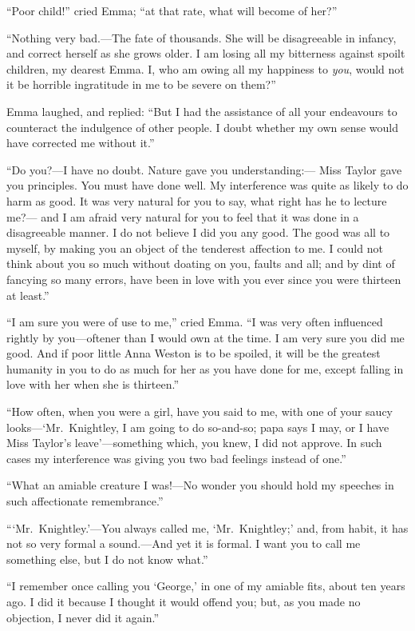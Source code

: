 ``Poor child!'' cried Emma; ``at that rate, what will become of her?''

``Nothing very bad.---The fate of thousands.  She will be disagreeable
in infancy, and correct herself as she grows older.  I am losing
all my bitterness against spoilt children, my dearest Emma.
I, who am owing all my happiness to \emph{you}, would not it be horrible
ingratitude in me to be severe on them?''

Emma laughed, and replied:  ``But I had the assistance of all
your endeavours to counteract the indulgence of other people.
I doubt whether my own sense would have corrected me without it.''

``Do you?---I have no doubt.  Nature gave you understanding:---%
Miss Taylor gave you principles.  You must have done well.
My interference was quite as likely to do harm as good.  It was
very natural for you to say, what right has he to lecture me?---%
and I am afraid very natural for you to feel that it was done
in a disagreeable manner.  I do not believe I did you any good.
The good was all to myself, by making you an object of the tenderest
affection to me.  I could not think about you so much without doating
on you, faults and all; and by dint of fancying so many errors,
have been in love with you ever since you were thirteen at least.''

``I am sure you were of use to me,'' cried Emma.  ``I was very often
influenced rightly by you---oftener than I would own at the time.
I am very sure you did me good.  And if poor little Anna Weston is
to be spoiled, it will be the greatest humanity in you to do as much
for her as you have done for me, except falling in love with her
when she is thirteen.''

``How often, when you were a girl, have you said to me, with one
of your saucy looks---`Mr.\ Knightley, I am going to do so-and-so;
papa says I may, or I have Miss Taylor's leave'---something which,
you knew, I did not approve.  In such cases my interference was giving
you two bad feelings instead of one.''

``What an amiable creature I was!---No wonder you should hold
my speeches in such affectionate remembrance.''

```Mr.\ Knightley.'---You always called me, `Mr.\ Knightley;' and,
from habit, it has not so very formal a sound.---And yet it is formal.
I want you to call me something else, but I do not know what.''

``I remember once calling you `George,' in one of my amiable fits,
about ten years ago.  I did it because I thought it would offend you;
but, as you made no objection, I never did it again.''

